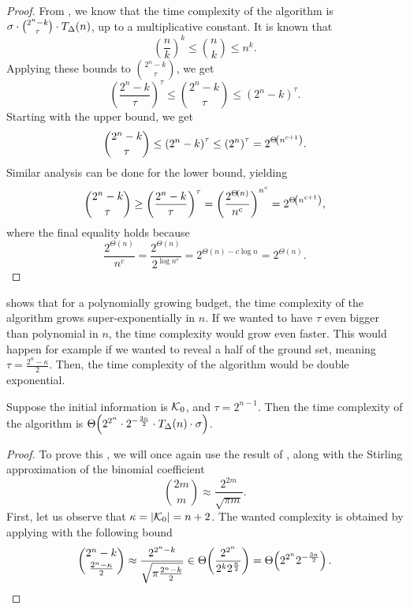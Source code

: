 \begin{proof}
  From , we know that the time complexity of the \algFO{} algorithm is $ \sigma \cdot \binom{2^n-k}{\tau} \cdot T_\Delta\!\left(n\right) $, up to a multiplicative constant.
  It is known that \[
    \left( \frac{n}{k} \right)^k \leq \binom nk \leq n^k.
  \]
  Applying these bounds to $ \binom{2^n-k}\tau $, we get \[
    \left( \frac{2^n-k}{\tau} \right)^\tau \leq \binom{2^n-k}\tau \leq \left( 2^n-k \right)^\tau.
  \]
  Starting with the upper bound, we get \begin{align*}
    \binom{2^n-k}\tau \leq \left( 2^n-k \right)^\tau \leq \left( 2^n \right)^\tau = 2^{\Theta\!\left(n^{c+1}\right)}.
  \end{align*}
  Similar analysis can be done for the lower bound, yielding
  \begin{align*}
    \binom{2^n-k}\tau \geq \left( \frac{2^n-k}{\tau} \right)^\tau = \left( \frac{2^{\Theta\!\left(n\right)}}{n^c} \right)^{n^c} = 2^{\Theta\!\left(n^{c+1}\right)},
  \end{align*}
  where the final equality holds because \[
      \frac{2^{\Theta(n)}}{n^c} = \frac{2^{\Theta(n)}}{2^{\log n^c}} = 2^{\Theta(n) - c \log n} = 2^{\Theta(n)}.
  \]
\end{proof}

 shows that for a polynomially growing budget, the time complexity of the \algFO{} algorithm grows super-exponentially in $ n $.
If we wanted to have $ \tau $ even bigger than polynomial in $ n $, the time complexity would grow even faster.
This would happen for example if we wanted to reveal a half of the ground set, meaning $ \tau = \frac{2^n - \kappa}{2} $.
Then, the time complexity of the \algFO{} algorithm would be double exponential.

\begin{prop}[ ]
  \label{thm:algfo-time-complexity-double-exp}
  Suppose the initial information is $ \mathcal{K}_0 $, and $ \tau = 2^{n-1} $.
  Then the time complexity of the \algFO{} algorithm is $ \Theta\!\left(2^{2^n} \cdot 2^{-\frac{3n}{2}} \cdot T_\Delta\!\left(n\right) \cdot \sigma\right) $.
\end{prop}

\begin{proof}
  To prove this , we will once again use the result of , along with the Stirling approximation of the binomial coefficient \[
    \binom {2m}m \approx \frac{2^{2m}}{\sqrt{\pi m}}.
  \]
  First, let us observe that $ \kappa = \left\lvert \mathcal{K}_0 \right\rvert = n + 2 $.
  The wanted complexity is obtained by applying  with the following bound \[
    \binom{2^{n}-k}{\frac{2^n - \kappa}{2}} \approx \frac{2^{2^n - k}}{\sqrt{\pi \frac{2^n - k}{2}}} \in \Theta\!\left(\frac{2^{2^n}}{2^k 2^{\frac n2}}\right) = \Theta\!\left(2^{2^n} 2^{-\frac{3n}{2}}\right).
  \]
\end{proof}

